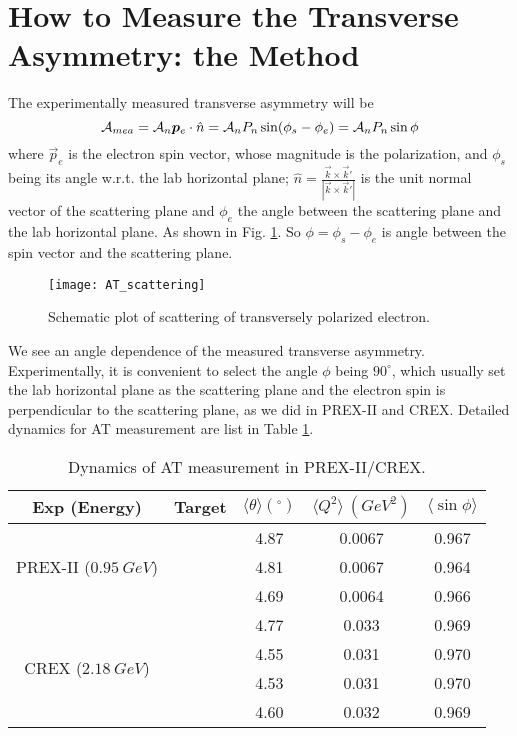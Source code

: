 \section{How to Measure the Transverse Asymmetry: the Method}
The experimentally measured transverse asymmetry will be
\begin{equation}
    \mathcal{A}_{mea} = \mathcal{A}_n \boldsymbol{p}_e \cdot \hat{n} = \mathcal{A}_n P_n \sin(\phi_s - \phi_e) = \mathcal{A}_n P_n \sin\phi
    \label{eq:measured_AT}
\end{equation}
where $\vec{p}_e$ is the electron spin vector, whose magnitude is the polarization,
and $\phi_s$ being its angle w.r.t. the lab horizontal plane; 
$\hat{n} = \frac{\vec{k} \times \vec{k}'}{|\vec{k} \times \vec{k}'|}$ 
is the unit normal vector of the scattering plane and $\phi_e$ the angle between
the scattering plane and the lab horizontal plane. As shown in Fig. \ref{fig:AT_scattering}.
So $\phi = \phi_s - \phi_e$ is angle between the spin vector and the scattering plane.
\begin{figure}[h!]
    \centering
    \texttt{[image: AT\_scattering]}
    \caption{Schematic plot of scattering of transversely polarized electron.}
    \label{fig:AT_scattering}
\end{figure}

We see an angle dependence of the measured transverse asymmetry. Experimentally,
it is convenient to select the angle $\phi$ being $90^\circ$, which
usually set the lab horizontal plane as the scattering plane and the electron spin
is perpendicular to the scattering plane, as we did in PREX-II and CREX. Detailed
dynamics for AT measurement are list in Table \ref{tab:AT_dynamics}.

\begin{table}
    \centering
    \begin{tabular}{c c | c c c}
	\hline
	Exp (Energy)	& Target    & $\langle \theta \rangle ({}^\circ)$   & $\langle Q^2 \rangle \ (GeV^2)$	& $\langle \sin\phi \rangle$	\\
	\hline
	\multirow{3}{*}{PREX-II ($0.95\ GeV$)}
	    & \C    & 4.87  & 0.0067    & 0.967 \\ 
	    & \ca   & 4.81  & 0.0067    & 0.964 \\ 
	    & \Pb   & 4.69  & 0.0064    & 0.966 \\ 
	\hline
	\multirow{4}{*}{CREX ($2.18\ GeV$)}
	    & \C    & 4.77  & 0.033	& 0.969 \\ 
	    & \ca   & 4.55  & 0.031	& 0.970 \\ 
	    & \Ca   & 4.53  & 0.031     & 0.970 \\ 
	    & \Pb   & 4.60  & 0.032     & 0.969 \\ 
	\hline
    \end{tabular}
    \caption{Dynamics of AT measurement in PREX-II/CREX.}
    \label{tab:AT_dynamics}
\end{table}

